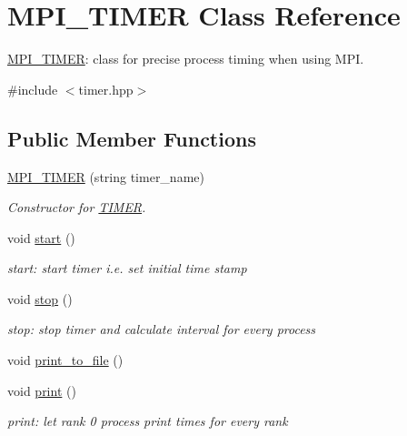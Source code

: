 \hypertarget{classMPI__TIMER}{}\section{M\+P\+I\+\_\+\+T\+I\+M\+ER Class Reference}
\label{classMPI__TIMER}


\mbox{\hyperlink{classMPI__TIMER}{M\+P\+I\+\_\+\+T\+I\+M\+ER}}\+: class for precise process timing when using M\+PI.  




{\ttfamily \#include $<$timer.\+hpp$>$}

\subsection*{Public Member Functions}
\begin{DoxyCompactItemize}
\item 
\mbox{\label{classMPI__TIMER_a988e600893d6827710aa28754c663b18}} 
\mbox{\hyperlink{classMPI__TIMER_a988e600893d6827710aa28754c663b18}{M\+P\+I\+\_\+\+T\+I\+M\+ER}} (string timer\+\_\+name)
\begin{DoxyCompactList}\small\item\em Constructor for \mbox{\hyperlink{classTIMER}{T\+I\+M\+ER}}. \end{DoxyCompactList}\item 
\mbox{\label{classMPI__TIMER_a17ed1a36df48a47d91486f570f58eda2}} 
void \mbox{\hyperlink{classMPI__TIMER_a17ed1a36df48a47d91486f570f58eda2}{start}} ()
\begin{DoxyCompactList}\small\item\em start\+: start timer i.\+e. set initial time stamp \end{DoxyCompactList}\item 
\mbox{\label{classMPI__TIMER_a8d31cf80e1e01f6d96cf1ff35cdce2b2}} 
void \mbox{\hyperlink{classMPI__TIMER_a8d31cf80e1e01f6d96cf1ff35cdce2b2}{stop}} ()
\begin{DoxyCompactList}\small\item\em stop\+: stop timer and calculate interval for every process \end{DoxyCompactList}\item 
void \mbox{\hyperlink{classMPI__TIMER_ae2b9502ad9811560bbab8032f8858b16}{print\+\_\+to\+\_\+file}} ()
\item 
\mbox{\label{classMPI__TIMER_ada0b12d22f4d9b29730bbce69d894306}} 
void \mbox{\hyperlink{classMPI__TIMER_ada0b12d22f4d9b29730bbce69d894306}{print}} ()
\begin{DoxyCompactList}\small\item\em print\+: let rank 0 process print times for every rank \end{DoxyCompactList}\end{DoxyCompactItemize}


